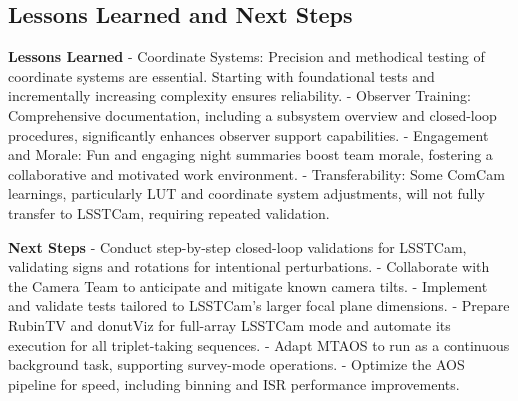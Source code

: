 \subsection{Lessons Learned and Next Steps}
\textbf{Lessons Learned}
- Coordinate Systems: Precision and methodical testing of coordinate systems are essential. 
Starting with foundational tests and incrementally increasing complexity ensures reliability.
- Observer Training: Comprehensive documentation, including a subsystem overview and closed-loop procedures, 
significantly enhances observer support capabilities.
- Engagement and Morale: Fun and engaging night summaries boost team morale, fostering a collaborative 
and motivated work environment.
- Transferability: Some ComCam learnings, particularly LUT and coordinate system adjustments, 
will not fully transfer to LSSTCam, requiring repeated validation.

\textbf{Next Steps}
- Conduct step-by-step closed-loop validations for LSSTCam, validating signs and rotations for intentional perturbations.
- Collaborate with the Camera Team to anticipate and mitigate known camera tilts.
- Implement and validate tests tailored to LSSTCam's larger focal plane dimensions.
- Prepare RubinTV and donutViz for full-array LSSTCam mode and automate its execution for all triplet-taking sequences.
- Adapt MTAOS to run as a continuous background task, supporting survey-mode operations.
- Optimize the AOS pipeline for speed, including binning and ISR performance improvements.


